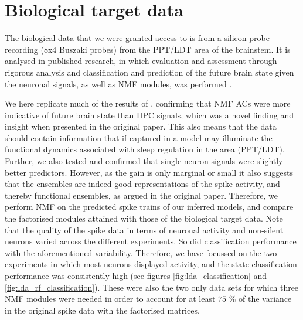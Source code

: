 \documentclass[mphil,deptreport,ianc]{infthesis} %
\begin{document}



\section{Biological target data}

The biological data that we were granted access to is from a silicon probe recording (8x4 Buszaki probes) from the PPT/LDT area of the brainstem. 
It is analysed in published research, in which evaluation and assessment through rigorous analysis and classification and prediction of the future brain state given the neuronal signals, as well as NMF modules, was performed \cite{Tsunematsu2019}. 

We here replicate much of the results of \cite{Tsunematsu2019}, confirming that NMF ACs were more indicative of future brain state than HPC signals, which was a novel finding and insight when presented in the original paper.
This also means that the data should contain information that if captured in a model may illuminate the functional dynamics associated with sleep regulation in the area (PPT/LDT).
Further, we also tested and confirmed that single-neuron signals were slightly better predictors. 
However, as the gain is only marginal or small it also suggests that the ensembles are indeed good representations of the spike activity, and thereby functional ensembles, as argued in the original paper.
Therefore, we perform NMF on the predicted spike trains of our inferred models, and compare the factorised modules attained with those of the biological target data.
Note that the quality of the spike data in terms of neuronal activity and non-silent neurons varied across the different experiments.
So did classification performance with the aforementioned variability.
Therefore, we have focussed on the two experiments in which most neurons displayed activity, and the state classification performance was consistently high (see figures \ref{fig:lda_classification} and \ref{fig:lda_rf_classification}).
These were also the two only data sets for which three NMF modules were needed in order to account for at least $75$ \% of the variance in the original spike data with the factorised matrices.
\end{document}
